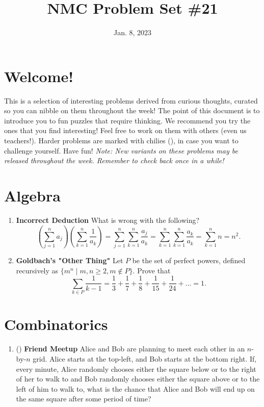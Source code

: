 \documentclass[11pt]{scrartcl}
\begin{document}
\title{NMC Problem Set \#21} %
\date{Jan. 8, 2023} %
\maketitle

\section*{Welcome!}

This is a selection of interesting problems derived from curious thoughts, curated so you can nibble on them throughout the week! The point of this document is to introduce you to fun puzzles that require thinking. We recommend you try the ones that you find interesting! Feel free to work on them with others (even us teachers!). Harder problems are marked with chilies (\fullchili), in case you want to challenge yourself.
\newline\newline
Have fun! \textit{Note: New variants on these problems may be released throughout the week. Remember to check back once in a while!}
    
\section{Algebra}
\begin{enumerate}[label=\textbf{A\arabic*}.]
    \item \textbf{Incorrect Deduction} \newline
    What is wrong with the following?
    \[ \left(\sum_{j=1}^{n} a_j\right) \left(\sum_{k=1}^{n} \frac{1}{a_k} \right) = \sum_{j=1}^{n} \sum_{k=1}^{n} \frac{a_j}{a_k} = \sum_{k=1}^{n} \sum_{k=1}^{n} \frac{a_k}{a_k} = \sum_{k=1}^{n} n = n^2. \]

    \item \textbf{Goldbach's "Other Thing"} \newline
    Let $P$ be the set of perfect powers, defined recursively as $\{ m^n \mid m, n \geq 2, m \not \in P \}$. Prove that
    \[ \sum_{k \in P} \frac{1}{k-1} = \frac{1}{3} + \frac{1}{7} + \frac{1}{8} + \frac{1}{15} + \frac{1}{24} + \dots = 1. \]
    
\end{enumerate}

\newpage
\section{Combinatorics}
\begin{enumerate}[label=\textbf{C\arabic*}.]
    \item (\fullchili) \textbf{Friend Meetup} \newline
    Alice and Bob are planning to meet each other in an $n$-by-$n$ grid. Alice starts at the top-left, and Bob starts at the bottom right. If, every minute, Alice randomly chooses either the square below or to the right of her to walk to and Bob randomly chooses either the square above or to the left of him to walk to, what is the chance that Alice and Bob will end up on the same square after some period of time?
\end{enumerate}
\end{document}

